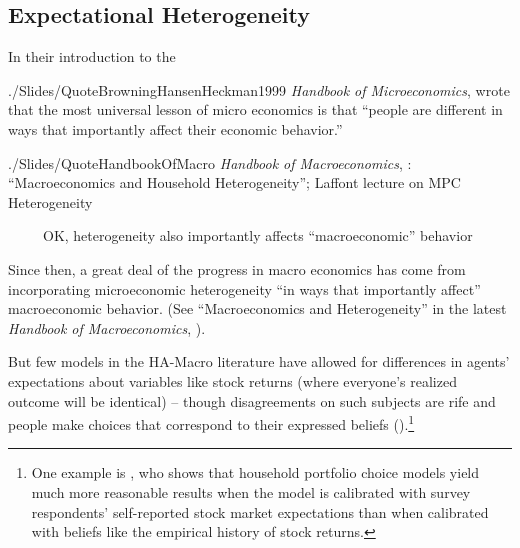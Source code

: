 \subsection{Expectational Heterogeneity}\label{EpiExpHet}
In their introduction to the 
\begin{verbatimwrite}{./Slides/QuoteBrowningHansenHeckman1999}
  \textit{Handbook of Microeconomics},  wrote that the most universal lesson of micro economics is that ``people are different in ways that importantly affect their economic behavior.''
\end{verbatimwrite}

\begin{verbatimwrite}{./Slides/QuoteHandbookOfMacro}
  \textit{Handbook of Macroeconomics}, \cite{kmpHandbook}: ``Macroeconomics and Household Heterogeneity'';  \cite{violante_marginal_2021} Laffont lecture on MPC Heterogeneity

  \pause \indent ~~~~~OK, heterogeneity also importantly affects ``macroeconomic'' behavior
\end{verbatimwrite}
Since then, a great deal of the progress in macro economics has come from incorporating microeconomic heterogeneity ``in ways that importantly affect'' macroeconomic behavior.  (See ``Macroeconomics and Heterogeneity'' in the latest \textit{Handbook of Macroeconomics}, \cite{kmpHandbook}).  


But few models in the HA-Macro literature have allowed for differences in agents' expectations about variables like stock returns (where everyone's realized outcome will be identical) -- though disagreements on such subjects are rife and people make choices that correspond to their expressed beliefs (\cite{gmsuBeliefs}).\footnote{One example is \cite{Velasquez2022}, who shows that household portfolio choice models yield much more reasonable results when the model is calibrated with survey respondents' self-reported stock market expectations than when calibrated with beliefs like the empirical history of stock returns.}



